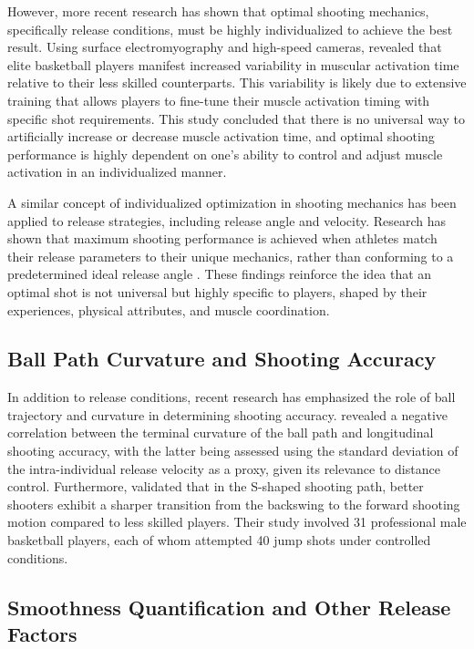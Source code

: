 \documentclass{article}
\begin{document}
      However, more recent research has shown that optimal shooting mechanics, specifically release conditions, must be highly individualized to achieve the best result. Using surface electromyography and high-speed cameras, \citet{pakosz_muscle_2021} revealed that elite basketball players manifest increased variability in muscular activation time relative to their less skilled counterparts. This variability is likely due to extensive training that allows players to fine-tune their muscle activation timing with specific shot requirements. This study concluded that there is no universal way to artificially increase or decrease muscle activation time, and optimal shooting performance is highly dependent on one's ability to control and adjust muscle activation in an individualized manner. 

      A similar concept of individualized optimization in shooting mechanics has been applied to release strategies, including release angle and velocity. Research has shown that maximum shooting performance is achieved when athletes match their release parameters to their unique mechanics, rather than conforming to a predetermined ideal release angle \citep{slegers_basketball_2022}. These findings reinforce the idea that an optimal shot is not universal but highly specific to players, shaped by their experiences, physical attributes, and muscle coordination. 

    \subsection{Ball Path Curvature and Shooting Accuracy}
    
      In addition to release conditions, recent research has emphasized the role of ball trajectory and curvature in determining shooting accuracy. \citet{slegers_role_2024} revealed a negative correlation between the terminal curvature of the ball path and longitudinal shooting accuracy, with the latter being assessed using the standard deviation of the intra-individual release velocity as a proxy, given its relevance to distance control. Furthermore, \citet{slegers_role_2024} validated that in the S-shaped shooting path, better shooters exhibit a sharper transition from the backswing to the forward shooting motion compared to less skilled players. Their study involved 31 professional male basketball players, each of whom attempted 40 jump shots under controlled conditions. 

    \subsection{Smoothness Quantification and Other Release Factors}
\end{document}
